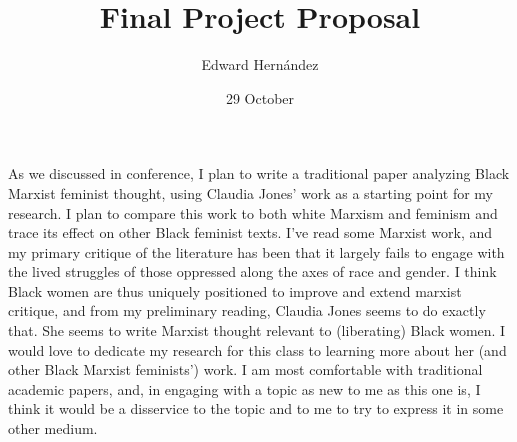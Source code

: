\documentclass[man,12pt]{apa6}
\begin{document}
\title{Final Project Proposal}
\author{Edward Hern\'{a}ndez}
\date{29 October}
\maketitle

As we discussed in conference, I plan to write a traditional paper analyzing
Black Marxist feminist thought, using Claudia Jones' work as a starting point
for my research. I plan to compare this work to both white Marxism and feminism
and trace its effect on other Black feminist texts. I've read some Marxist
work, and my primary critique of the literature has been that it largely fails
to engage with the lived struggles of those oppressed along the axes of race
and gender. I think Black women are thus uniquely positioned to improve and
extend marxist critique, and from my preliminary reading, Claudia Jones seems
to do exactly that. She seems to write Marxist thought relevant to (liberating)
Black women. I would love to dedicate my research for this class to learning
more about her (and other Black Marxist feminists') work. I am most comfortable
with traditional academic papers, and, in engaging with a topic as new to me as
this one is, I think it would be a disservice to the topic and to me to try to
express it in some other medium.
%
\end{document}
